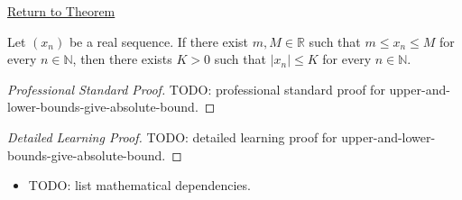\newpage
{}
\label{prf:upper-lower-bounds-absolute-bound}

\begin{remark*}[Return]
\hyperref[thm:upper-lower-bounds-absolute-bound]{Return to Theorem}
\end{remark*}

\begin{theorem*}
Let $(x_n)$ be a real sequence. If there exist $m,M \in \mathbb{R}$ such
that $m \le x_n \le M$ for every $n \in \mathbb{N}$, then there exists
$K > 0$ such that $|x_n| \le K$ for every $n \in \mathbb{N}$.

\smallskip
\noindent
\end{theorem*}

\begin{proof}[Professional Standard Proof]
\LRAProofBodyStart
TODO: professional standard proof for upper-and-lower-bounds-give-absolute-bound.
\end{proof}

\begin{proof}[Detailed Learning Proof]
\LRAProofBodyStart
TODO: detailed learning proof for upper-and-lower-bounds-give-absolute-bound.
\end{proof}

\begin{remark*}
\end{remark*}

\begin{dependencies}
\begin{itemize}
  \item TODO: list mathematical dependencies.
\end{itemize}
\end{dependencies}

\clearpage

